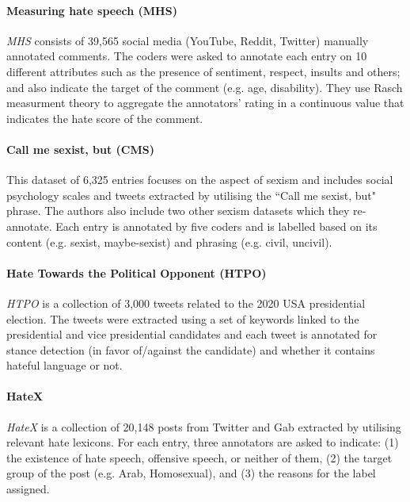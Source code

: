     \paragraph{Measuring hate speech (MHS)}
    \textit{MHS} \cite{kennedy2020constructing, sachdeva-etal-2022-measuring}  consists of 39,565  social media (YouTube, Reddit, Twitter) manually annotated comments. The coders were asked to annotate each entry on 10 different attributes such as the presence of sentiment, respect, insults and others; and also indicate the target of the comment (e.g. age, disability). They use Rasch measurment theory \cite{rasch1960studies} to aggregate the annotators' rating in a continuous value that indicates the hate score of the comment. 
    
    \paragraph{Call me sexist, but (CMS)} 
    This dataset of 6,325 entries \cite{samory2021call} focuses on the aspect of sexism and includes social psychology scales and tweets extracted by utilising the ``Call me sexist, but" phrase. The authors also include two other sexism datasets \cite{jha-mamidi-2017-compliment, Talat2016HatefulSO} which they re-annotate. Each entry is annotated by five coders and is labelled based on its content (e.g. sexist, maybe-sexist) and phrasing (e.g. civil, uncivil).
    
    \paragraph{Hate Towards the Political Opponent (HTPO)}
    \textit{HTPO} \cite{grimminger-klinger-2021-hate} is a collection of 3,000 tweets related to the 2020 USA presidential election. The tweets were extracted using a set of keywords linked to the presidential and vice presidential candidates and each tweet is annotated for stance detection (in favor of/against the candidate) and whether it contains hateful language or not.
    
    \paragraph{HateX}
    \textit{HateX} \cite{mathew2021hatexplain} is a collection of 20,148 posts from Twitter and Gab extracted by utilising relevant hate lexicons. For each entry, three annotators are asked to indicate: (1) the existence of hate speech, offensive speech, or neither of them, (2) the target group of the post (e.g. Arab, Homosexual), and (3) the reasons for the label assigned. %
    
